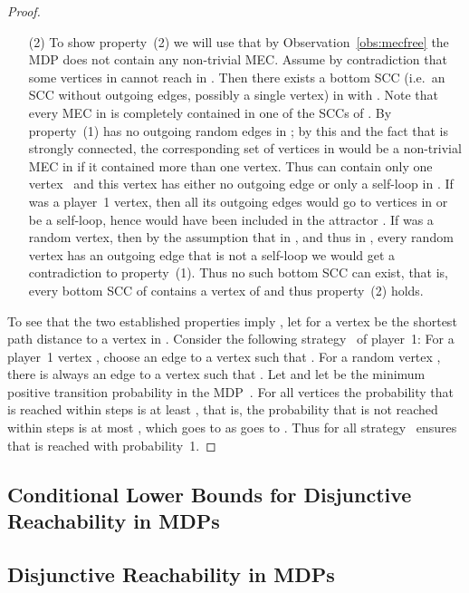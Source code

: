 \documentclass[11pt,letterpaper]{article}
\newif\iffullversion
\newcommand{\inshort}[1]{\iffullversion \else #1\fi}
\begin{document}
{\begin{proof}
\begin{enumerate}
  \item[(2)] To show property~(2) we will use that by Observation~\ref{obs:mecfree} the 
	MDP  does not contain any non-trivial MEC. 
	Assume by contradiction that some vertices in 
	 cannot reach  in .
	Then there exists a bottom SCC  (i.e.\ an SCC without outgoing edges, 
	possibly a single vertex)
	in  with . Note that 
	every MEC in  is completely contained in one of the SCCs of .
	By property~(1)  has no outgoing random edges in ; by this and the fact 
	that  is strongly connected,
	the corresponding set  of vertices in  
	would be a non-trivial MEC in  if it contained
	more than one vertex. Thus  can contain only one vertex~ and this 
	vertex has either no outgoing 
	edge or only a self-loop in . If  was 
	a player~1 vertex, then all its outgoing edges would go to vertices in  
	or be a self-loop, hence  would have been included in the attractor .
	If  was a random vertex, then by the assumption that in , and thus in 
	, every random vertex 
	has an outgoing edge that is not a self-loop we would get a contradiction to
	property~(1). Thus no such bottom SCC  can exist, that is, every bottom SCC
	of  contains a vertex of  and thus property~(2) holds.
\end{enumerate}

To see that the two established properties imply 
, let for a vertex 
be  the shortest path distance to a vertex in . Consider the 
following strategy~ of player~1: For a player~1 vertex , 
choose an edge to a vertex  such that . For a random vertex , 
there is always an edge to a vertex  such that .
Let  and let  be the minimum positive
transition probability in the MDP~. For all vertices 
the probability that  is reached within  steps 
is at least , that is, the probability that  is not 
reached within  steps is at most , 
which goes to  as  goes to . Thus for all  strategy~
ensures that  is reached with probability~1.
\end{proof}



\subsection{Conditional Lower Bounds for Disjunctive Reachability in MDPs}
\label{subsec:reach_lowerbounds}

}
\inshort{
\subsection{Disjunctive Reachability in MDPs}
\label{subsec:reach_lowerbounds}
}
\end{document}
